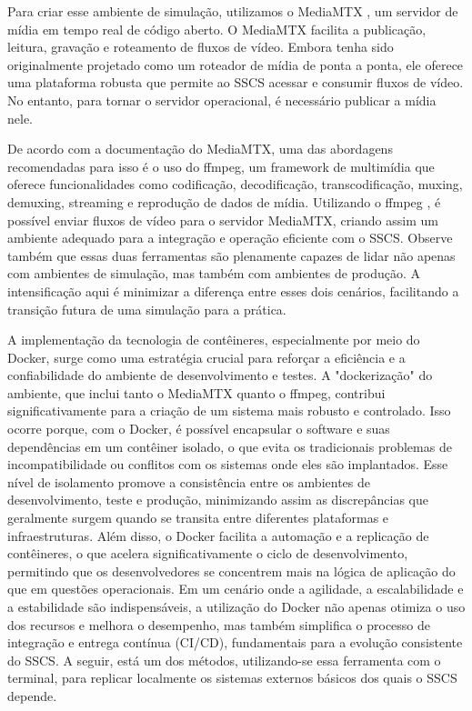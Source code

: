 \documentclass[12pt, %
openright, 
oneside, %
a4paper,    %
brazil]{facom-ufu-abntex2}
\begin{document}
Para criar esse ambiente de simulação, utilizamos o MediaMTX \cite{mediamtx},
um servidor de mídia em tempo real de código aberto. O MediaMTX facilita a
publicação, leitura, gravação e roteamento de fluxos de vídeo. Embora tenha
sido originalmente projetado como um roteador de mídia de ponta a ponta, ele
oferece uma plataforma robusta que permite ao SSCS acessar e consumir fluxos de
vídeo. No entanto, para tornar o servidor operacional, é necessário publicar a
mídia nele.

De acordo com a documentação do MediaMTX, uma das abordagens recomendadas para
isso é o uso do ffmpeg, um framework de multimídia que oferece funcionalidades
como codificação, decodificação, transcodificação, muxing, demuxing, streaming
e reprodução de dados de mídia. Utilizando o ffmpeg \cite{ffmpeg}, é possível
enviar fluxos de vídeo para o servidor MediaMTX, criando assim um ambiente
adequado para a integração e operação eficiente com o SSCS. Observe também que
essas duas ferramentas são plenamente capazes de lidar não apenas com ambientes
de simulação, mas também com ambientes de produção. A intensificação aqui é
minimizar a diferença entre esses dois cenários, facilitando a transição futura
de uma simulação para a prática.

A implementação da tecnologia de contêineres, especialmente por meio do Docker,
surge como uma estratégia crucial para reforçar a eficiência e a confiabilidade
do ambiente de desenvolvimento e testes. A "dockerização" do ambiente, que
inclui tanto o MediaMTX quanto o ffmpeg, contribui significativamente para a
criação de um sistema mais robusto e controlado. Isso ocorre porque, com o
Docker, é possível encapsular o software e suas dependências em um contêiner
isolado, o que evita os tradicionais problemas de incompatibilidade ou
conflitos com os sistemas onde eles são implantados. Esse nível de isolamento
promove a consistência entre os ambientes de desenvolvimento, teste e produção,
minimizando assim as discrepâncias que geralmente surgem quando se transita
entre diferentes plataformas e infraestruturas. Além disso, o Docker facilita a
automação e a replicação de contêineres, o que acelera significativamente o
ciclo de desenvolvimento, permitindo que os desenvolvedores se concentrem mais
na lógica de aplicação do que em questões operacionais. Em um cenário onde a
agilidade, a escalabilidade e a estabilidade são indispensáveis, a utilização
do Docker não apenas otimiza o uso dos recursos e melhora o desempenho, mas
também simplifica o processo de integração e entrega contínua (CI/CD),
fundamentais para a evolução consistente do SSCS. A seguir, está um dos
métodos, utilizando-se essa ferramenta com o terminal, para replicar localmente
os sistemas externos básicos dos quais o SSCS depende.
\end{document}
